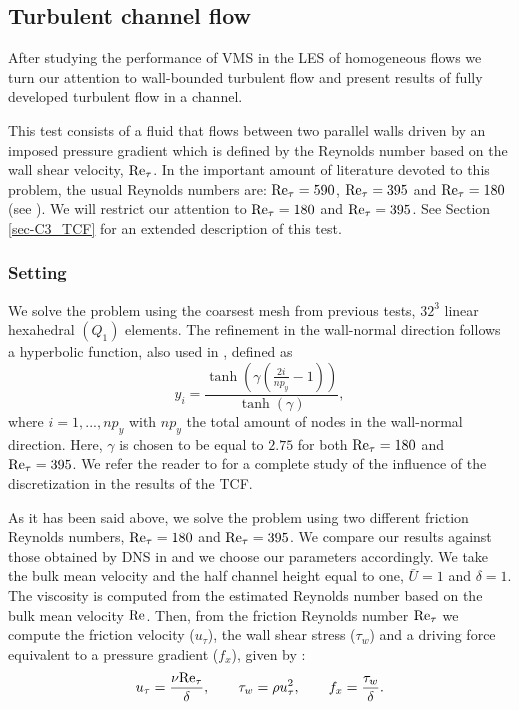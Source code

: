 \subsection{Turbulent channel flow}
\label{subsec-C4_TCF}
After studying the performance of VMS in the LES of homogeneous flows we turn our attention to wall-bounded turbulent flow and present results of fully developed turbulent flow in a channel.

This test consists of a fluid that flows between two parallel walls driven by an imposed pressure gradient which is defined by the Reynolds number based on the wall shear velocity, ${\rm Re}_\tau$. In the important amount of literature devoted to this problem, the usual Reynolds numbers are: ${\rm Re}_\tau=590$, ${\rm Re}_\tau=395$  and ${\rm Re}_\tau=180$ (see \cite{bazilevs_variational_2007, Calderer2013, gamnitzer_time-dependent_2010, gravemeier_algebraic_2010, gullbrand_effect_2003, hughes_large_2001, john_variants_2008, kim_turbulence_1987, masud_variational_2011, moser_direct_1999}). We will restrict our attention to ${\rm Re}_\tau=180$ and ${\rm Re}_\tau=395$. See Section \ref{sec-C3_TCF} for an extended description of this test.

\subsubsection{Setting}
\label{subsubsec-C4_TCF_setting}

We solve the problem using the coarsest mesh from previous tests, $32^3$ linear hexahedral $(Q_1)$ elements. The refinement in the wall-normal direction follows a hyperbolic function, also used in \cite{Calderer2013,  gamnitzer_time-dependent_2010,  gravemeier_algebraic_2010, gullbrand_effect_2003, masud_variational_2011}, defined as 
$$y_i=\frac{\tanh\left(\gamma\left(\frac{2i}{np_y}-1\right)\right)}{\tanh(\gamma)},$$
where $i=1,...,np_y$ with $np_y$ the total amount of nodes in the wall-normal direction. Here, $\gamma$ is  chosen to be equal to $2.75$ for both  ${\rm Re}_\tau=180$ and ${\rm Re}_\tau=395$.  We refer the reader to \cite{Avila2014} for a complete study of the influence of the discretization in the results of the TCF.

As it has been said above, we solve the problem using two different friction Reynolds numbers, ${\rm Re}_\tau=180$ and ${\rm Re}_\tau=395$. We compare our results against those obtained by DNS in \cite{moser_direct_1999,kim_turbulence_1987} and we choose our parameters accordingly.
We take the bulk mean velocity and the half channel height equal to one, $\bar{U}=1$ and $\delta=1$. The viscosity is computed from the estimated Reynolds number based on the bulk mean velocity ${\rm Re}$. Then, from the friction Reynolds number ${\rm Re}_\tau$ we compute the friction velocity ($u_\tau$), the wall shear stress ($\tau_w$) and a driving force equivalent to a pressure gradient ($f_x$), given by  \cite{pope_turbulent_2000}:
$$u_\tau=\frac{\nu {\rm Re}_\tau}{\delta},\quad\quad\tau_w=\rho u_\tau^2,\quad\quad
f_x=\frac{\tau_w}{\delta}.$$

